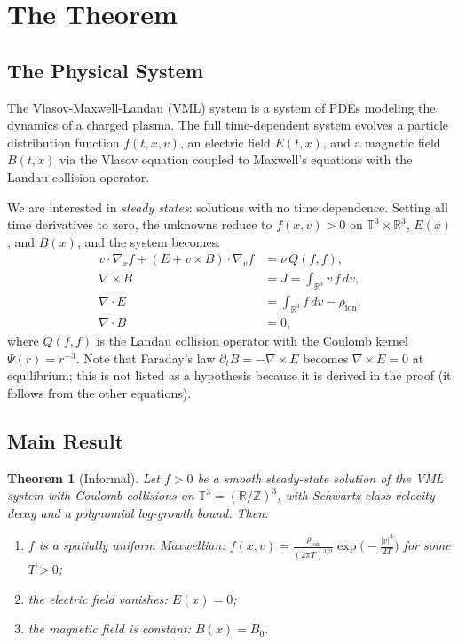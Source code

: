 \documentclass[11pt]{article}
\newtheorem{theorem}{Theorem}
\newcommand{\RR}{\mathbb{R}}
\newcommand{\TT}{\mathbb{T}}
\begin{document}
\section{The Theorem}
\label{sec:theorem}

\subsection{The Physical System}

The Vlasov-Maxwell-Landau (VML) system is a system of PDEs modeling the dynamics of a charged plasma. The full time-dependent system evolves a particle distribution function $f(t,x,v)$, an electric field $E(t,x)$, and a magnetic field $B(t,x)$ via the Vlasov equation coupled to Maxwell's equations with the Landau collision operator.

We are interested in \emph{steady states}: solutions with no time dependence. Setting all time derivatives to zero, the unknowns reduce to $f(x,v) > 0$ on $\TT^3 \times \RR^3$, $E(x)$, and $B(x)$, and the system becomes:
\begin{align}
  v \cdot \nabla_x f + (E + v \times B) \cdot \nabla_v f &= \nu \, Q(f,f), \label{eq:vlasov} \\
  \nabla \times B &= J = \int_{\RR^3} v \, f \, dv, \label{eq:ampere} \\
  \nabla \cdot E &= \int_{\RR^3} f \, dv - \rho_{\mathrm{ion}}, \label{eq:gauss} \\
  \nabla \cdot B &= 0, \label{eq:divB}
\end{align}
where $Q(f,f)$ is the Landau collision operator with the Coulomb kernel $\Psi(r) = r^{-3}$. Note that Faraday's law $\partial_t B = -\nabla \times E$ becomes $\nabla \times E = 0$ at equilibrium; this is not listed as a hypothesis because it is derived in the proof (it follows from the other equations).

\subsection{Main Result}

\begin{theorem}[Informal]
\label{thm:main-informal}
Let $f > 0$ be a smooth steady-state solution of the VML system with Coulomb collisions on $\TT^3 = (\RR/\mathbb{Z})^3$, with Schwartz-class velocity decay and a polynomial log-growth bound. Then:
\begin{enumerate}
  \item $f$ is a spatially uniform Maxwellian: $f(x,v) = \frac{\rho_{\mathrm{ion}}}{(2\pi T)^{3/2}} \exp\!\bigl(-\tfrac{|v|^2}{2T}\bigr)$ for some $T > 0$;
  \item the electric field vanishes: $E(x) = 0$;
  \item the magnetic field is constant: $B(x) = B_0$.
\end{enumerate}
\end{theorem}
\end{document}
